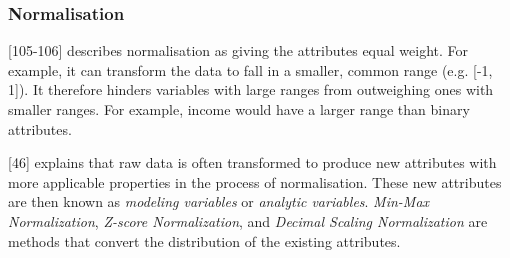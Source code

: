 

\subsubsection{Normalisation}



\textcite{han2011data}[105-106] describes normalisation as giving the attributes equal weight. For example, it can transform the data to fall in a smaller, common range (e.g. [-1, 1]). It therefore hinders variables with large ranges from outweighing ones with smaller ranges. For example, income would have a larger range than binary attributes. 

\textcite{dataPreprocessingInDataMining}[46] explains that raw data is often transformed to produce new attributes with more applicable properties in the process of normalisation. These new attributes are then known as \textit{modeling variables} or \textit{analytic variables}. \textit{Min-Max Normalization}, \textit{Z-score Normalization}, and \textit{Decimal Scaling Normalization} are methods that convert the distribution of the existing attributes.



